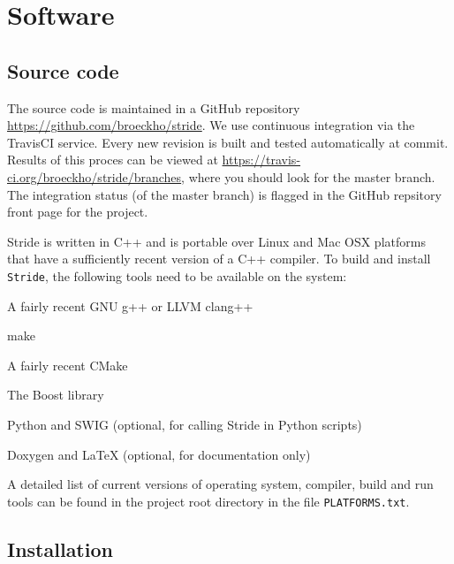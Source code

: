 \chapter{Software}
\label{chap:software}


\section{Source code}
\label{section:source}
The source code is maintained in a GitHub repository \url{https://github.com/broeckho/stride}. We use continuous integration via the TravisCI service. Every new revision is built and tested automatically at commit. Results of this proces can be viewed at \url{https://travis-ci.org/broeckho/stride/branches}, where you should look for the master branch. The integration status (of the master branch) is flagged in the GitHub repsitory front page for the project. 

Stride is written in C++ and is portable over Linux and Mac OSX platforms that have a sufficiently recent version of a C++ compiler. To build and install \texttt{Stride}, the following tools need to be available on the system:
\begin{compactitem}
    \item A fairly recent GNU g++ or LLVM clang++
    \item make
    \item A fairly recent CMake
    \item The Boost library
    \item Python and SWIG (optional, for calling Stride in Python scripts)
    \item Doxygen  and LaTeX (optional, for documentation only)
\end{compactitem}
A detailed list of current versions of operating system, compiler, build and run tools can be found in the project root directory in the file \texttt{PLATFORMS.txt}.

\section{Installation}
\label{section:Installation}

